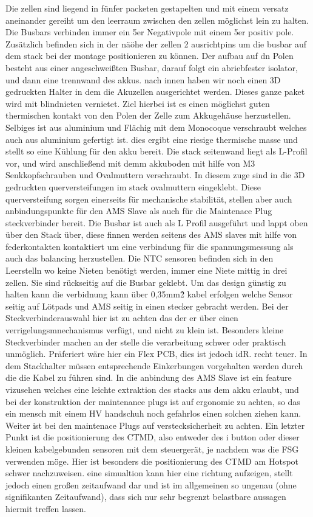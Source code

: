 Die zellen sind liegend in fünfer packeten gestapelten und mit einem versatz aneinander gereiht um den leerraum zwischen den zellen möglichst lein zu halten. Die Busbars verbinden immer ein 5er Negativpole mit einem 5er positiv pole. Zusätzlich befinden sich in der näöhe der zellen 2 ausrichtpins um die busbar auf dem stack bei der montage positionieren zu können. Der aufbau auf dn Polen besteht aus einer angeschweißten Busbar, darauf folgt ein abriebfester isolator, und dann eine trennwand des akkus. nach innen haben wir noch einen 3D gedruckten Halter in dem die Akuzellen ausgerichtet werden. Dieses ganze paket wird mit blindnieten vernietet. Ziel hierbei ist es einen möglichst guten thermischen kontakt von den Polen der Zelle zum Akkugehäuse herzustellen. Selbiges ist aus aluminium und Flächig mit dem Monocoque verschraubt welches auch aus aluminium gefertigt ist. dies ergibt eine riesige thermische masse und stellt so eine Kühlung für den akku bereit. Die stack seitenwand liegt als L-Profil vor, und wird anschließend mit demm akkuboden mit hilfe von M3 Senkkopfschrauben und Ovalmuttern verschraubt. In diesem zuge sind in die 3D gedruckten querversteifungen im stack ovalmuttern eingeklebt. Diese querversteifung sorgen einerseits für mechanische stabilität, stellen aber auch anbindungspunkte für den AMS Slave als auch für die Maintenace Plug steckverbinder bereit. Die Busbar ist auch als L Profil ausgeführt und lappt oben über den Stack über, diese finnen werden seitens des AMS slaves mit hilfe von federkontakten kontaktiert um eine verbindung für die spannungsmessung als auch das balancing herzustellen. Die NTC sensoren befinden sich in den Leerstelln wo keine Nieten benötigt werden, immer eine Niete mittig in drei zellen. Sie sind rückseitig auf die Busbar geklebt. Um das design günstig zu halten kann die verbidnung kann über 0,35mm\^2 kabel erfolgen welche Sensor seitig auf Lötpads und AMS seitig in einen stecker gebracht werden. Bei der Steckverbinderauswahl hier ist zu achten das der er über einen verrigelungsmnechanismus verfügt, und nicht zu klein ist. Besonders kleine Steckverbinder machen an der stelle die verarbeitung schwer oder praktisch unmöglich. Präferiert wäre hier ein Flex PCB, dies ist jedoch idR. recht teuer. In dem Stackhalter müssen entsprechende Einkerbungen vorgehalten werden durch die die Kabel zu führen sind. In die anbindung des AMS Slave ist ein feature vizusehen welches eine leichte extraktion des stacks aus dem akku erlaubt, und bei der konstruktion der maintenance plugs ist auf ergonomie zu achten, so das ein mensch mit einem HV handschuh noch gefahrlos einen solchen ziehen kann. Weiter ist bei den maintenace Plugs auf verstecksicherheit zu achten. Ein letzter Punkt ist die positionierung des CTMD, also entweder des i button oder dieser kleinen kabelgebunden sensoren mit dem steuergerät, je nachdem was die FSG verwenden möge. Hier ist besonders die positionierung des CTMD am Hotspot schwer nachzuweisen. eine simualtion kann hier eine richtung aufzeigen, stellt jedoch einen großen zeitaufwand dar und ist im allgemeinen so ungenau (ohne signifikanten Zeitaufwand), dass sich nur sehr begrenzt belastbare aussagen hiermit treffen lassen.

